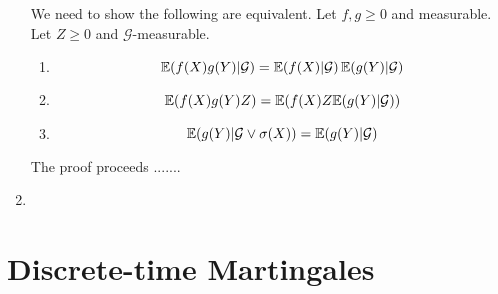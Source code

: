 \begin{enumerate}
  We need to show the following are equivalent.  Let $f, g \geq 0$ and
  measurable.  Let $Z \geq 0$ and $\mathcal{G}$-measurable.  
  \begin{enumerate}
  \item \label{item:1}
    \begin{equation}
      \label{eq:17}
      \E{f(X) g(Y) | \mathcal{G}} = \E{f(X) | \mathcal{G}} \E{g(Y) | \mathcal{G}}
    \end{equation}
  \item \label{item:2}
    \begin{equation}
      \label{eq:18}
      \E{f(X) g(Y) Z} = \E{f(X) Z \E{g(Y) | \mathcal{G}}} 
    \end{equation}
  \item \label{item:3}
    \begin{equation}
      \label{eq:19}
      \E{g(Y) | \mathcal{G} \vee \sigma(X)} = \E{g(Y) | \mathcal{G}}
    \end{equation}
  \end{enumerate}

  The proof proceeds .......
\item 
\end{enumerate}

\section{Discrete-time Martingales}
\label{sec:discr-time-mart}

